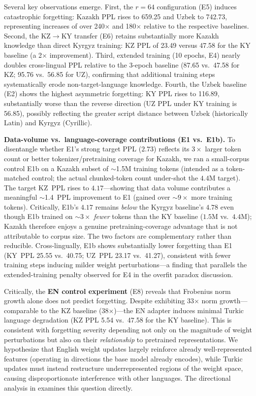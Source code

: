 \documentclass[11pt]{article}
\begin{document}
Several key observations emerge. First, the $r{=}64$ configuration (E5) induces catastrophic forgetting: Kazakh PPL rises to 659.25 and Uzbek to 742.73, representing increases of over 240$\times$ and 180$\times$ relative to the respective baselines. Second, the KZ$\rightarrow$KY transfer (E6) retains substantially more Kazakh knowledge than direct Kyrgyz training: KZ PPL of 23.49 versus 47.58 for the KY baseline (a 2$\times$ improvement). Third, extended training (10 epochs, E4) nearly doubles cross-lingual PPL relative to the 3-epoch baseline (87.65 vs.\ 47.58 for KZ; 95.76 vs.\ 56.85 for UZ), confirming that additional training steps systematically erode non-target-language knowledge. Fourth, the Uzbek baseline (E2) shows the highest asymmetric forgetting: KY PPL rises to 116.89, substantially worse than the reverse direction (UZ PPL under KY training is 56.85), possibly reflecting the greater script distance between Uzbek (historically Latin) and Kyrgyz (Cyrillic).

\textbf{Data-volume vs.\ language-coverage contributions (E1 vs.\ E1b).} To disentangle whether E1's strong target PPL ($2.73$) reflects its $3\times$ larger token count or better tokenizer/pretraining coverage for Kazakh, we ran a small-corpus control E1b on a Kazakh subset of $\sim$1.5M training tokens (intended as a token-matched control; the actual chunked-token count under-shot the $4.4$M target). The target KZ~PPL rises to $4.17$---showing that data volume contributes a meaningful $\sim$1.4~PPL improvement to E1 (gained over $\sim 9\times$ more training tokens). Critically, E1b's $4.17$ remains \emph{below} the Kyrgyz baseline's $4.78$ even though E1b trained on $\sim 3\times$ \emph{fewer} tokens than the KY baseline ($1.5$M vs.\ $4.4$M); Kazakh therefore enjoys a genuine pretraining-coverage advantage that is not attributable to corpus size. The two factors are complementary rather than reducible. Cross-lingually, E1b shows substantially lower forgetting than E1 (KY~PPL 25.55 vs.\ 40.75; UZ~PPL 23.17 vs.\ 41.27), consistent with fewer training steps inducing milder weight perturbations---a finding that parallels the extended-training penalty observed for E4 in the overfit paradox discussion.

Critically, the \textbf{EN control experiment} (E8) reveals that Frobenius norm growth alone does not predict forgetting. Despite exhibiting 33$\times$ norm growth---comparable to the KZ baseline (38$\times$)---the EN adapter induces minimal Turkic language degradation (KZ PPL 5.54 vs.\ 47.58 for the KY baseline). This is consistent with forgetting severity depending not only on the magnitude of weight perturbations but also on their \emph{relationship} to pretrained representations. We hypothesize that English weight updates largely reinforce already well-represented features (operating in directions the base model already encodes), while Turkic updates must instead restructure underrepresented regions of the weight space, causing disproportionate interference with other languages. The directional analysis in  examines this question directly.
\end{document}
